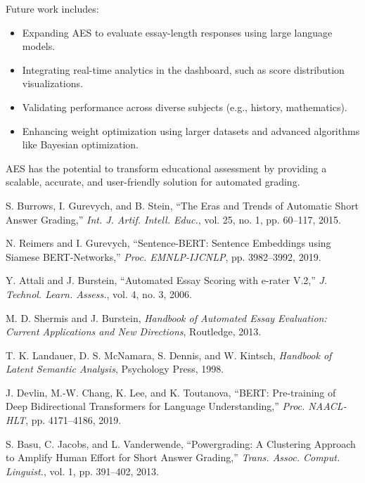 \documentclass[conference]{IEEEtran}
\begin{document}
Future work includes:
\begin{itemize}
    \item Expanding AES to evaluate essay-length responses using large language models.
    \item Integrating real-time analytics in the dashboard, such as score distribution visualizations.
    \item Validating performance across diverse subjects (e.g., history, mathematics).
    \item Enhancing weight optimization using larger datasets and advanced algorithms like Bayesian optimization.
\end{itemize}

AES has the potential to transform educational assessment by providing a scalable, accurate, and user-friendly solution for automated grading.

\begin{thebibliography}{9}
S. Burrows, I. Gurevych, and B. Stein, ``The Eras and Trends of Automatic Short Answer Grading,'' \textit{Int. J. Artif. Intell. Educ.}, vol. 25, no. 1, pp. 60--117, 2015.

N. Reimers and I. Gurevych, ``Sentence-BERT: Sentence Embeddings using Siamese BERT-Networks,'' \textit{Proc. EMNLP-IJCNLP}, pp. 3982--3992, 2019.

Y. Attali and J. Burstein, ``Automated Essay Scoring with e-rater V.2,'' \textit{J. Technol. Learn. Assess.}, vol. 4, no. 3, 2006.

M. D. Shermis and J. Burstein, \textit{Handbook of Automated Essay Evaluation: Current Applications and New Directions}, Routledge, 2013.

T. K. Landauer, D. S. McNamara, S. Dennis, and W. Kintsch, \textit{Handbook of Latent Semantic Analysis}, Psychology Press, 1998.

J. Devlin, M.-W. Chang, K. Lee, and K. Toutanova, ``BERT: Pre-training of Deep Bidirectional Transformers for Language Understanding,'' \textit{Proc. NAACL-HLT}, pp. 4171--4186, 2019.

S. Basu, C. Jacobs, and L. Vanderwende, ``Powergrading: A Clustering Approach to Amplify Human Effort for Short Answer Grading,'' \textit{Trans. Assoc. Comput. Linguist.}, vol. 1, pp. 391--402, 2013.
\end{thebibliography}
\end{document}
